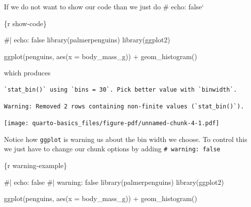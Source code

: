 \documentclass[
  letterpaper,
  DIV=11,
  numbers=noendperiod,
  oneside]{scrreprt}
\newenvironment{Shaded}{\begin{snugshade}}{\end{snugshade}}
\newcommand{\AttributeTok}[1]{\textcolor[rgb]{0.40,0.45,0.13}{#1}}
\newcommand{\CommentTok}[1]{\textcolor[rgb]{0.37,0.37,0.37}{#1}}
\newcommand{\FunctionTok}[1]{\textcolor[rgb]{0.28,0.35,0.67}{#1}}
\newcommand{\InformationTok}[1]{\textcolor[rgb]{0.37,0.37,0.37}{#1}}
\newcommand{\NormalTok}[1]{\textcolor[rgb]{0.00,0.23,0.31}{#1}}
\newcommand{\SpecialCharTok}[1]{\textcolor[rgb]{0.37,0.37,0.37}{#1}}
\begin{document}
If we do not want to show our code than we just do \#\textbar{} echo:
false`

\begin{Shaded}
\begin{Highlighting}[]
\InformationTok{\textasciigrave{}\textasciigrave{}\textasciigrave{}\{r show{-}code\}}

\CommentTok{\#| echo: false }
\FunctionTok{library}\NormalTok{(palmerpenguins)}
\FunctionTok{library}\NormalTok{(ggplot2)}

\FunctionTok{ggplot}\NormalTok{(penguins, }\FunctionTok{aes}\NormalTok{(}\AttributeTok{x =}\NormalTok{ body\_mass\_g)) }\SpecialCharTok{+}
\FunctionTok{geom\_histogram}\NormalTok{()}
\InformationTok{\textasciigrave{}\textasciigrave{}\textasciigrave{}}
\end{Highlighting}
\end{Shaded}

which produces

\begin{verbatim}
`stat_bin()` using `bins = 30`. Pick better value with `binwidth`.
\end{verbatim}

\begin{verbatim}
Warning: Removed 2 rows containing non-finite values (`stat_bin()`).
\end{verbatim}

\texttt{[image: quarto-basics\_files/figure-pdf/unnamed-chunk-4-1.pdf]}

Notice how \texttt{ggplot} is warning us about the bin width we choose.
To control this we just have to change our chunk options by adding
\texttt{\#\textbar{}\ warning:\ false}

\begin{Shaded}
\begin{Highlighting}[]
\InformationTok{\textasciigrave{}\textasciigrave{}\textasciigrave{}\{r warning{-}example\}}

\CommentTok{\#| echo: false }
\CommentTok{\#| warning: false}
\FunctionTok{library}\NormalTok{(palmerpenguins)}
\FunctionTok{library}\NormalTok{(ggplot2)}

\FunctionTok{ggplot}\NormalTok{(penguins, }\FunctionTok{aes}\NormalTok{(}\AttributeTok{x =}\NormalTok{ body\_mass\_g)) }\SpecialCharTok{+}
\FunctionTok{geom\_histogram}\NormalTok{()}
\InformationTok{\textasciigrave{}\textasciigrave{}\textasciigrave{}}
\end{Highlighting}
\end{Shaded}
\end{document}
